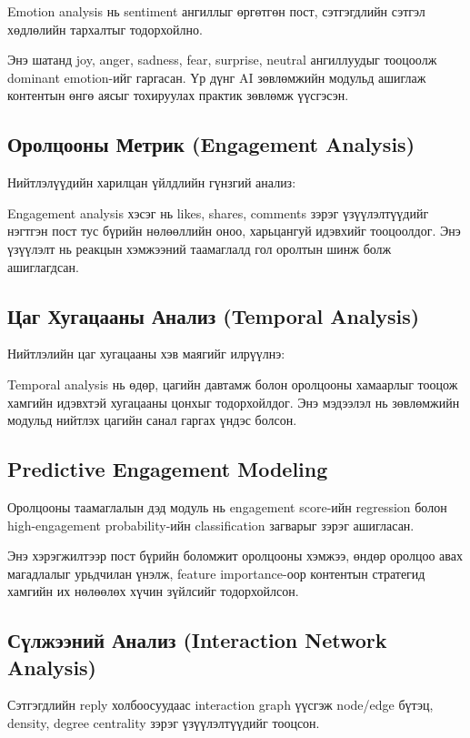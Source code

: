 \documentclass[12pt,a4paper]{report}
\begin{document}
Emotion analysis нь sentiment ангиллыг өргөтгөн пост, сэтгэгдлийн сэтгэл хөдлөлийн тархалтыг тодорхойлно.

Энэ шатанд joy, anger, sadness, fear, surprise, neutral ангиллуудыг тооцоолж dominant emotion-ийг гаргасан. Үр дүнг AI зөвлөмжийн модульд ашиглаж контентын өнгө аясыг тохируулах практик зөвлөмж үүсгэсэн.


\subsection{Оролцооны Метрик (Engagement Analysis)}

Нийтлэлүүдийн харилцан үйлдлийн гүнзгий анализ:

Engagement analysis хэсэг нь likes, shares, comments зэрэг үзүүлэлтүүдийг нэгтгэн пост тус бүрийн нөлөөллийн оноо, харьцангуй идэвхийг тооцоолдог. Энэ үзүүлэлт нь реакцын хэмжээний таамаглалд гол оролтын шинж болж ашиглагдсан.


\subsection{Цаг Хугацааны Анализ (Temporal Analysis)}

Нийтлэлийн цаг хугацааны хэв маягийг илрүүлнэ:

Temporal analysis нь өдөр, цагийн давтамж болон оролцооны хамаарлыг тооцож хамгийн идэвхтэй хугацааны цонхыг тодорхойлдог. Энэ мэдээлэл нь зөвлөмжийн модульд нийтлэх цагийн санал гаргах үндэс болсон.


\subsection{Predictive Engagement Modeling}

Оролцооны таамаглалын дэд модуль нь engagement score-ийн regression болон high-engagement probability-ийн classification загварыг зэрэг ашигласан.

Энэ хэрэгжилтээр пост бүрийн боломжит оролцооны хэмжээ, өндөр оролцоо авах магадлалыг урьдчилан үнэлж, feature importance-оор контентын стратегид хамгийн их нөлөөлөх хүчин зүйлсийг тодорхойлсон.


\subsection{Сүлжээний Анализ (Interaction Network Analysis)}

Сэтгэгдлийн reply холбоосуудаас interaction graph үүсгэж node/edge бүтэц, density, degree centrality зэрэг үзүүлэлтүүдийг тооцсон.
\end{document}
